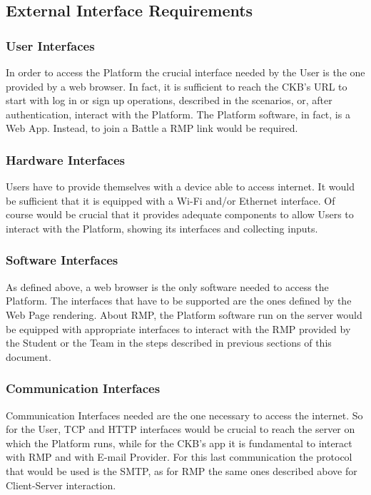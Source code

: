 \subsection{External Interface Requirements}

\subsubsection{User Interfaces}
In order to access the Platform the crucial interface needed by the User is the one provided by a web browser. In fact, it is sufficient to reach the CKB's URL to start with log in or sign up operations, described in the scenarios, or, 
after authentication, interact with the Platform. The Platform software, in fact, is a Web App. Instead, to join a Battle a RMP link would be required.

\subsubsection{Hardware Interfaces}
Users have to provide themselves with a device able to access internet. It would be sufficient that it is equipped with a Wi-Fi and/or Ethernet interface. Of course would be crucial that it provides adequate components to allow Users 
to interact with the Platform, showing its interfaces and collecting inputs.

\subsubsection{Software Interfaces}
As defined above, a web browser is the only software needed to access the Platform. The interfaces that have to be supported are the ones defined by the Web Page rendering. About RMP, the Platform software run on the server would be 
equipped with appropriate interfaces to interact with the RMP provided by the Student or the Team in the steps described in previous sections of this document.
\subsubsection{Communication Interfaces}
Communication Interfaces needed are the one necessary to access the internet. So for the User, TCP and HTTP interfaces would be crucial to reach the server on which the Platform runs, while for the CKB's app it is fundamental to 
interact with RMP and with E-mail Provider. For this last communication the protocol that would be used is the SMTP, as for RMP the same ones described above for Client-Server interaction.

